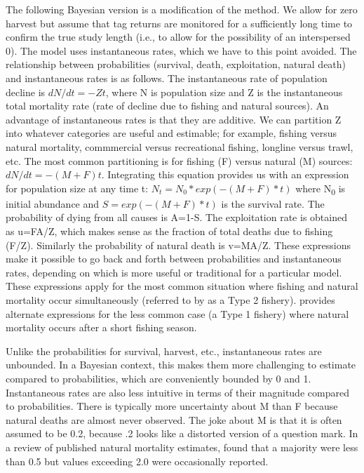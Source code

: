\documentclass[
]{krantz}
\begin{document}
The following Bayesian version is a modification of the \citet{hearn.etal1987} method. We allow for zero harvest but assume that tag returns are monitored for a sufficiently long time to confirm the true study length (i.e., to allow for the possibility of an interspersed 0). The \citet{hearn.etal1987} model uses instantaneous rates, which we have to this point avoided. The relationship between probabilities (survival, death, exploitation, natural death) and instantaneous rates is as follows. The instantaneous rate of population decline is \(dN/dt = -Zt\), where N is population size and Z is the instantaneous total mortality rate (rate of decline due to fishing and natural sources). An advantage of instantaneous rates is that they are additive. We can partition Z into whatever categories are useful and estimable; for example, fishing versus natural mortality, commmercial versus recreational fishing, longline versus trawl, etc. The most common partitioning is for fishing (F) versus natural (M) sources: \(dN/dt = -(M+F)t\). Integrating this equation provides us with an expression for population size at any time t:
\(N_t = N_0 * exp(-(M+F)*t)\)
where N\textsubscript{0} is initial abundance and \(S=exp(-(M+F)*t)\) is the survival rate. The probability of dying from all causes is A=1-S. The exploitation rate is obtained as u=FA/Z, which makes sense as the fraction of total deaths due to fishing (F/Z). Similarly the probability of natural death is v=MA/Z. These expressions make it possible to go back and forth between probabilities and instantaneous rates, depending on which is more useful or traditional for a particular model. These expressions apply for the most common situation where fishing and natural mortality occur simultaneously (referred to by \citet{ricker1975} as a Type 2 fishery). \citet{ricker1975} provides alternate expressions for the less common case (a Type 1 fishery) where natural mortality occurs after a short fishing season.

Unlike the probabilities for survival, harvest, etc., instantaneous rates are unbounded. In a Bayesian context, this makes them more challenging to estimate compared to probabilities, which are conveniently bounded by 0 and 1. Instantaneous rates are also less intuitive in terms of their magnitude compared to probabilities. There is typically more uncertainty about M than F because natural deaths are almost never observed. The joke about M is that it is often assumed to be 0.2, because .2 looks like a distorted version of a question mark. In a review of published natural mortality estimates, \citet{vetter1988} found that a majority were less than 0.5 but values exceeding 2.0 were occasionally reported.
\end{document}
